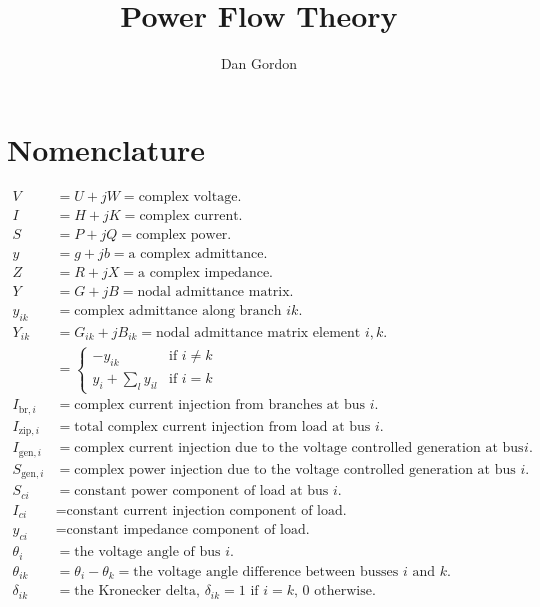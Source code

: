 \documentclass[11pt]{article}
\title{Power Flow Theory}
\author{Dan Gordon}
\date{}
\newcommand{\Vr}{\ensuremath{U}}
\newcommand{\Ir}{\ensuremath{H}}
\newcommand{\Ii}{\ensuremath{K}}
\begin{document}
\maketitle

\section{Nomenclature}
\begin{align*}
V &= \Vr + jW = \text{complex voltage.} \\
I &= \Ir + j\Ii = \text{complex current.} \\
S &= P + jQ = \text{complex power.} \\
y &= g + jb = \text{a complex admittance.} \\
Z &= R + jX = \text{a complex impedance.} \\
Y &= G + jB = \text{nodal admittance matrix.} \\
y_{ik} &= \text{complex admittance along branch $ik$.} \\
Y_{ik} &= G_{ik} + jB_{ik} = \text{nodal admittance matrix element $i, k$.} \\
&= 
	\begin{cases}
		-y_{ik}&\text{if $i \ne k$} \\
		y_i + \sum_l y_{il}& \text{if $i = k$}
	\end{cases} \\
I_{\text{br},i} &= \text{complex current injection from branches at bus $i$.} \\
I_{\text{zip},i} &= \text{total complex current injection from load at bus $i$.} \\
I_{\text{gen},i} &= \text{complex current injection due to the voltage controlled generation at bus $i$.} \\
S_{\text{gen},i} &= \text{complex power injection due to the voltage controlled generation at bus $i$.} \\
S_{ci} &= \text{constant power component of load at bus $i$.} \\
I_{ci} &= \text{constant current injection component of load.} \\
y_{ci} &= \text{constant impedance component of load.} \\
\theta_{i} &= \text{the voltage angle of bus $i$.} \\
\theta_{ik} &= \theta_i - \theta_k = \text{the voltage angle difference between busses $i$ and $k$.} \\
\delta_{ik} &= \text{the Kronecker delta, $\delta_{ik} = 1$ if $i = k$, 0 otherwise.}
\end{align*}
\end{document}
